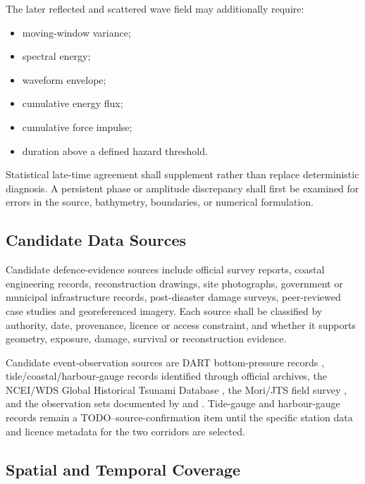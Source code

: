 The later reflected and scattered wave field may additionally require:

\begin{itemize}
  \item moving-window variance;
  \item spectral energy;
  \item waveform envelope;
  \item cumulative energy flux;
  \item cumulative force impulse;
  \item duration above a defined hazard threshold.
\end{itemize}

Statistical late-time agreement shall supplement rather than replace
deterministic diagnosis. A persistent phase or amplitude discrepancy
shall first be examined for errors in the source, bathymetry,
boundaries, or numerical formulation.

\subsection{Candidate Data Sources}
\label{sec:res-dat-obs-candidate-data-sources}

Candidate defence-evidence sources include official survey reports, coastal
engineering records, reconstruction drawings, site photographs, government or
municipal infrastructure records, post-disaster damage surveys, peer-reviewed
case studies and georeferenced imagery. Each source shall be classified by
authority, date, provenance, licence or access constraint, and whether it
supports geometry, exposure, damage, survival or reconstruction evidence.

Candidate event-observation sources are DART bottom-pressure records
\parencite{noaa2005dart,noaa2011japanDart}, tide/coastal/harbour-gauge
records identified through official archives, the NCEI/WDS Global
Historical Tsunami Database \parencite{noaaNceiHistoricalTsunami}, the
Mori/JTS field survey \parencite{mori2012nationwide}, and the
observation sets documented by \textcite{fine2013japan} and
\textcite{wei2013japan}. Tide-gauge and harbour-gauge records remain a
TODO--source-confirmation item until the specific station data and
licence metadata for the two corridors are selected.

\subsection{Spatial and Temporal Coverage}
\label{sec:res-dat-obs-spatial-temporal-coverage}

